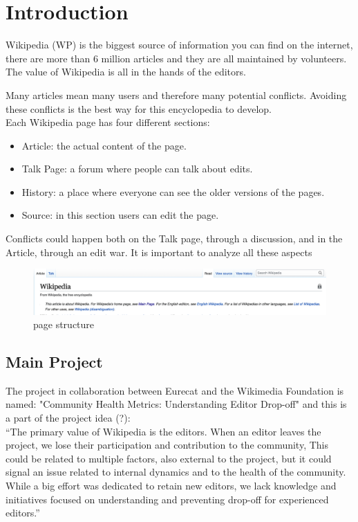 \chapter{Introduction}
Wikipedia (WP) is the biggest source of information you can find on the internet, there are more than 6 million articles and they are all
maintained by volunteers. The value of Wikipedia is all in the hands of the editors.

Many articles mean many users and therefore many potential conflicts. Avoiding these conflicts is the best way 
for this encyclopedia to develop. 
 \\ 
Each Wikipedia page has four different sections:  
\begin{itemize}
    \item Article: the actual content of the page.
    \item Talk Page: a forum where people can talk about edits. 
    \item History: a place where everyone can see the older versions of the pages.
    \item Source: in this section users can edit the page. 
\end{itemize}

Conflicts could happen both on the Talk page, through a discussion, and in the Article, through an edit war. It is important to analyze 
all these aspects 

\begin{figure}
    \centering
    \includegraphics[width=1\textwidth]{./chapters/01/assets/wikipedia_page.png}
    \caption{page structure}
    \label{fig:page}
\end{figure}

\section{Main Project}
\label{sec:Main Project}
The project in collaboration between Eurecat and the Wikimedia Foundation is named: "Community Health Metrics: Understanding Editor Drop-off" and this is 
a part of the project idea (?):
\\

“The primary value of Wikipedia is the editors. When an editor leaves the project, we lose their participation and contribution to the community, This could be related to multiple factors, also external to the project, but it could signal an issue related to internal dynamics and to the health of the community. While a big effort was dedicated to retain new editors, we lack knowledge and initiatives focused on understanding and preventing drop-off for experienced editors.”
\\

